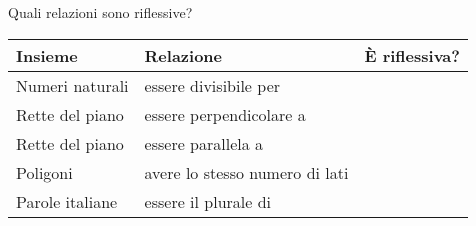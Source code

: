 \begin{comment}
\begin{inaccessibleblock}[Figura: TODO]
 \begin{figure}[t]
\begin{minipage}[b]{.69\textwidth}
 \centering
 
 \caption{Esercizio \ref{ese:B.14}.}\label{fig:B.15}
\end{minipage}\
\begin{minipage}[b]{.3\textwidth}
 \centering
 
 \caption{Esercizio \ref{ese:B.18}.}\label{fig:B.16}
\end{minipage}
\end{figure}
\end{inaccessibleblock}


\end{comment}


\newpage %

\begin{esercizio}
\label{ese:B.19}
Quali relazioni sono riflessive?
\begin{center}
\begin{tabular}{llc}
\toprule
Insieme & Relazione & È riflessiva?\\
\midrule
Numeri naturali & essere divisibile per &  \boxSi\quad\boxNo \\
Rette del piano & essere perpendicolare a &  \boxSi\quad\boxNo \\
Rette del piano & essere parallela a &  \boxSi\quad\boxNo \\
Poligoni & avere lo stesso numero di lati &  \boxSi\quad\boxNo \\
Parole italiane & essere il plurale di &  \boxSi\quad\boxNo \\
\bottomrule
\end{tabular}
\end{center}
\end{esercizio}

